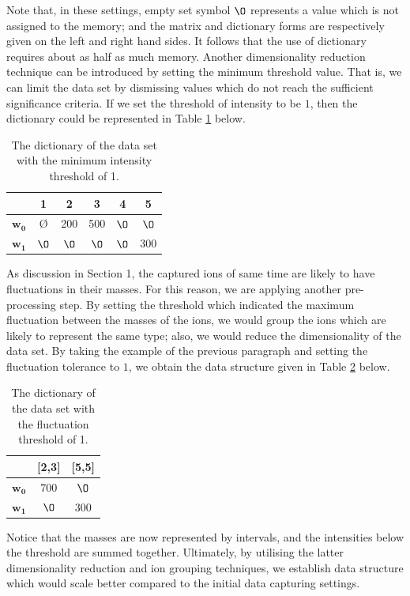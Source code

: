 \documentclass{mprop}
\begin{document}
Note that, in these settings, empty set symbol $\O$ represents a value which is not assigned to the memory; and the matrix and dictionary forms are respectively given on the left and right hand sides. It follows that the use of dictionary requires about as half as much memory. Another dimensionality reduction technique can be introduced by setting the minimum threshold value. That is, we can limit the data set by dismissing values which do not reach the sufficient significance criteria. If we set the threshold of intensity to be $1$, then the dictionary could be represented in Table \ref{tab:d_threshhold} below.
\begin{table}[H]
\begin{center}
\begin{tabular}{|c||c|c|c|c|c|}
\hline
&1&2&3&4&5\\
\hline
$\mathbf{w_0}$&\O&200&500&$\O$&$\O$\\
$\mathbf{w_1}$&$\O$&$\O$&$\O$&$\O$&300\\
\hline
\end{tabular}
\end{center}
\caption{The dictionary of the data set with the minimum intensity threshold of 1.}
\label{tab:d_threshhold}
\end{table}

\par As discussion in Section 1, the captured ions of same time are likely to have fluctuations in their masses. For this reason, we are applying another pre-processing step. By setting the threshold which indicated the maximum fluctuation between the masses of the ions, we would group the ions which are likely to represent the same type; also, we would reduce the dimensionality of the data set. By taking the example of the previous paragraph and setting the fluctuation tolerance to $1$, we obtain the data structure given in Table \ref{tab:d_f_threshhold} below.
\begin{table}[H]
\begin{center}
\begin{tabular}{|c||c|c|}
\hline
&[2,3]&[5,5]\\
\hline
$\mathbf{w_0}$&700&$\O$\\
$\mathbf{w_1}$&$\O$&300\\
\hline
\end{tabular}
\end{center}
\caption{The dictionary of the data set with the fluctuation threshold of 1.}
\label{tab:d_f_threshhold}
\end{table}
Notice that the masses are now represented by intervals, and the intensities below the threshold are summed together. Ultimately, by utilising the latter dimensionality reduction and ion grouping techniques, we establish data structure which would scale better compared to the initial data capturing settings.
\end{document}
